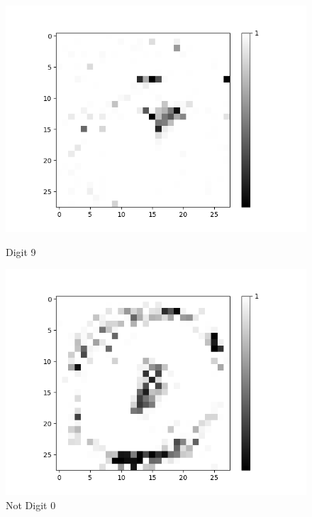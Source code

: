 \begin{figure}[H]
\begin{minipage}[b]{0.19\textwidth}
		\includegraphics[width=\textwidth]{AND(LSM)/Positive/Layer0-Neuron-9.png}
		\caption{Digit 9}
	\end{minipage}
	\hfill
	\begin{minipage}[b]{0.19\textwidth}
		\includegraphics[width=\textwidth]{AND(LSM)/Negative/Layer0-Neuron-0.png}
		\caption{Not Digit 0}
	\end{minipage}
	\begin{minipage}[b]{0.19\textwidth}

\end{minipage}
\end{figure}
